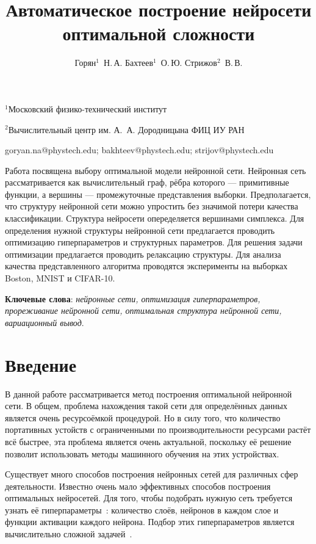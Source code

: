 \documentclass[12pt,twoside]{article}
\begin{document}
\title
    {Автоматическое построение нейросети оптимальной сложности}
\author
    {Горян$^1$~Н.\,А. Бахтеев$^1$~О.\,Ю.  Стрижов$^2$~В.\,В.} %

\organization
    {$^1$Московский физико-технический институт\par
    $^2$Вычислительный центр им. А.~А. Дородницына ФИЦ ИУ РАН}

\email
    {goryan.na@phystech.edu; bakhteev@phystech.edu; strijov@phystech.edu}    


    

\abstract
	{Работа посвящена выбору оптимальной модели нейронной сети. Нейронная сеть рассматривается как вычислительный граф, рёбра которого --- примитивные функции, а вершины --- промежуточные представления выборки. Предполагается, что структуру нейронной сети можно упростить без значимой потери качества классификации. Структура нейросети опеределяется вершинами симплекса. Для определения нужной структуры нейронной сети предлагается проводить оптимизацию гиперпараметров и структурных параметров. Для решения задачи оптимизации предлагается проводить релаксацию структуры. Для анализа качества представленного алгоритма проводятся эксперименты на выборках Boston, MNIST и CIFAR-10.
\bigskip

\textbf{Ключевые слова}: \emph {нейронные сети, оптимизация гиперпараметров, прореживание нейронной сети, оптимальная структура нейронной сети, вариационный вывод}.
}


\maketitle


\section{ Введение}
	
	В данной работе рассматривается метод построения оптимальной нейронной сети. В общем, проблема нахождения такой сети для определённых данных является очень ресурсоёмкой процедурой. Но в силу того, что количество портативных устойств с ограниченными по производительности ресурсами растёт всё быстрее, эта проблема является очень актуальной, поскольку её решение позволит использовать методы машинного обучения на этих устройствах.
	
	Существует много способов построения нейронных сетей для различных сфер деятельности. Известно очень мало эффективных
	способов построения оптимальных нейросетей. Для того, чтобы подобрать нужную сеть требуется узнать её гиперпараметры~\cite{Myung1997}: количество слоёв, нейронов в каждом слое и функции активации каждого нейрона. Подбор этих гиперпараметров является вычислительно сложной задачей~\cite{sutskever2014}.
	
\end{document}
